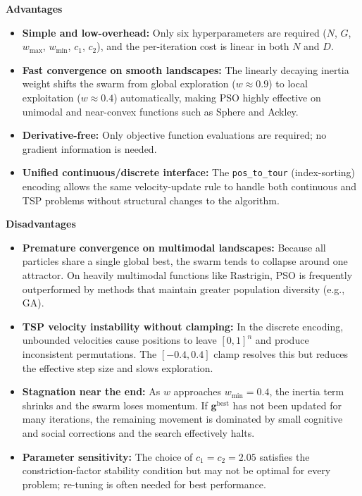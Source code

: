 \textbf{Advantages}

\begin{itemize}
  \item \textbf{Simple and low-overhead:} Only six hyperparameters are required
        ($N$, $G$, $w_{\max}$, $w_{\min}$, $c_1$, $c_2$), and the per-iteration cost is
        linear in both $N$ and $D$.
  \item \textbf{Fast convergence on smooth landscapes:} The linearly decaying inertia weight
        shifts the swarm from global exploration ($w\approx 0.9$) to local exploitation
        ($w\approx 0.4$) automatically, making PSO highly effective on unimodal and
        near-convex functions such as Sphere and Ackley.
  \item \textbf{Derivative-free:} Only objective function evaluations are required; no
        gradient information is needed.
  \item \textbf{Unified continuous/discrete interface:} The \texttt{pos\_to\_tour}
        (index-sorting) encoding allows the same velocity-update rule to handle both
        continuous and TSP problems without structural changes to the algorithm.
\end{itemize}

\textbf{Disadvantages}

\begin{itemize}
  \item \textbf{Premature convergence on multimodal landscapes:} Because all particles share
        a single global best, the swarm tends to collapse around one attractor. On heavily
        multimodal functions like Rastrigin, PSO is frequently outperformed by methods that
        maintain greater population diversity (e.g., GA).
  \item \textbf{TSP velocity instability without clamping:} In the discrete encoding,
        unbounded velocities cause positions to leave $[0,1]^n$ and produce inconsistent
        permutations. The $[-0.4, 0.4]$ clamp resolves this but reduces the effective step
        size and slows exploration.
  \item \textbf{Stagnation near the end:} As $w$ approaches $w_{\min}=0.4$, the inertia term
        shrinks and the swarm loses momentum. If $\mathbf{g}^{\text{best}}$ has not been
        updated for many iterations, the remaining movement is dominated by small cognitive
        and social corrections and the search effectively halts.
  \item \textbf{Parameter sensitivity:} The choice of $c_1=c_2=2.05$ satisfies the
        constriction-factor stability condition but may not be optimal for every problem;
        re-tuning is often needed for best performance.
\end{itemize}

